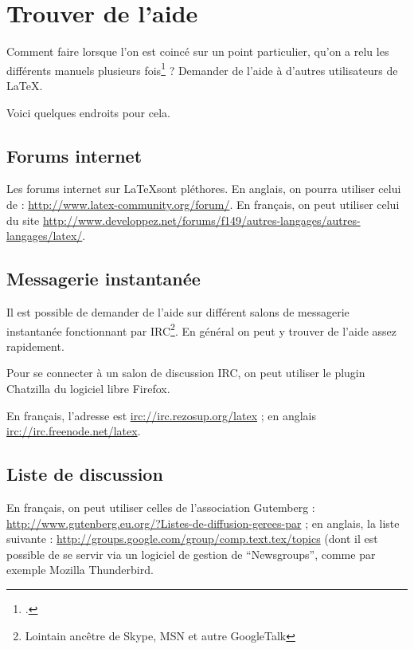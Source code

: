 \chapter{Trouver de l'aide}

\begin{prealable}
Comment faire lorsque l'on est coincé sur un point particulier, qu'on a relu les différents manuels plusieurs fois\footcite[Signalons au passage la possibilité de télécharger une aide sur l'ensemble des erreurs de compilation avec \LaTeX][]{erreurscompilo} ? Demander de l'aide à d'autres utilisateurs de \LaTeX{}.

Voici quelques endroits pour cela. 
\end{prealable}


\section{Forums internet}

Les forums internet sur \LaTeX sont pléthores. En anglais, on pourra utiliser celui de  : \url{http://www.latex-community.org/forum/}. En français, on peut utiliser celui du site  \url{http://www.developpez.net/forums/f149/autres-langages/autres-langages/latex/}.


\section{Messagerie instantanée}

Il est possible de demander de l'aide sur différent salons de messagerie instantanée fonctionnant par IRC\footnote{Lointain ancêtre de Skype, MSN et autre GoogleTalk}. En général on peut y trouver de l'aide assez rapidement.

Pour se connecter à un salon de discussion IRC, on peut utiliser le plugin Chatzilla du logiciel libre Firefox.

En français, l'adresse est \url{irc://irc.rezosup.org/latex} ; en anglais
\url{irc://irc.freenode.net/latex}.


\section{Liste de discussion}

En français, on peut utiliser celles de l'association Gutemberg : \url{http://www.gutenberg.eu.org/?Listes-de-diffusion-gerees-par} ; en anglais,  la liste suivante : \url{http://groups.google.com/group/comp.text.tex/topics} (dont il est possible de se servir via un logiciel de gestion de \enquote{{Newsgroups}}, comme par exemple Mozilla Thunderbird.
